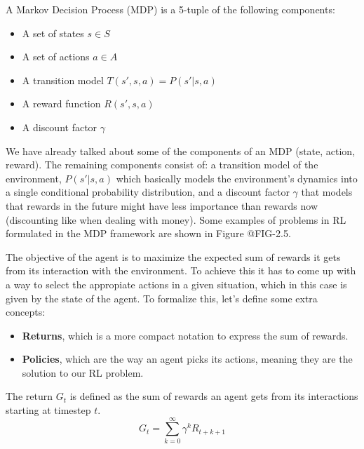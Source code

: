 \begin{definition}
    A Markov Decision Process (MDP) is a 5-tuple of the following components:
    \begin{itemize}
        \item A set of states $s \in S$
        \item A set of actions $a \in A$
        \item A transition model $T(s',s,a) = P(s'|s,a)$
        \item A reward function $R(s',s,a)$
        \item A discount factor $\gamma$
    \end{itemize}
\end{definition}

We have already talked about some of the components of an MDP (state, action, reward).
The remaining components consist of: a transition model of the environment, $P(s'|s,a)$
which basically models the environment's dynamics into a single conditional probability
distribution, and a discount factor $\gamma$ that models that rewards in the future might have
less importance than rewards now (discounting like when dealing with money). Some examples 
of problems in RL formulated in the MDP framework are shown in Figure @FIG-2.5.

\figMdpSamples

The objective of the agent is to maximize the expected sum of rewards it gets from
its interaction with the environment. To achieve this it has to come up with a
way to select the appropiate actions in a given situation, which in this case is given
by the state of the agent. To formalize this, let's define some extra concepts:

\begin{itemize}
    \item \textbf{Returns}, which is a more compact notation to express the sum of rewards.
    \item \textbf{Policies}, which are the way an agent picks its actions, meaning they
          are the solution to our RL problem.
\end{itemize}

\newpage

\begin{definition}
    The return $G_{t}$ is defined as the sum of rewards an agent gets from its
    interactions starting at timestep $t$.
    \begin{equation}
        G_{t} = \sum_{k=0}^{\infty} \gamma^{k} R_{t+k+1}
    \end{equation}
\end{definition}

